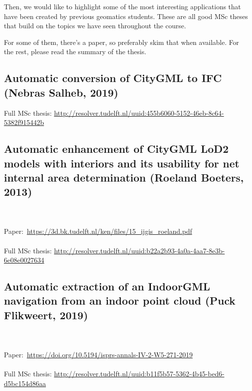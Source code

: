 Then, we would like to highlight some of the most interesting applications that have been created by previous geomatics students.
These are all good MSc theses that build on the topics we have seen throughout the course.

For some of them, there's a paper, so preferably skim that when available.
For the rest, please read the summary of the thesis.

\subsection{Automatic conversion of CityGML to IFC (Nebras Salheb, 2019)}

\begin{link-box}
Full MSc thesis: \url{http://resolver.tudelft.nl/uuid:455b6060-5152-46eb-8c64-5382f915442b}
\end{link-box}

\subsection{Automatic enhancement of CityGML LoD2 models with interiors and its usability for net internal area determination (Roeland Boeters, 2013)}

\begin{link-box}
\\ \\
Paper:\ \url{https://3d.bk.tudelft.nl/ken/files/15_ijgis_roeland.pdf}
\\ \\
Full MSc thesis: \url{http://resolver.tudelft.nl/uuid:b22a2b93-4a0a-4aa7-8e3b-6e08e0027634}
\end{link-box}

\subsection{Automatic extraction of an IndoorGML navigation from an indoor point cloud (Puck Flikweert, 2019)}

\begin{link-box}
\\ \\
Paper:\ \url{https://doi.org/10.5194/isprs-annals-IV-2-W5-271-2019}
\\ \\
Full MSc thesis: \url{http://resolver.tudelft.nl/uuid:b11f5b57-5362-4b45-bed6-d5bc154d86aa}
\end{link-box}

